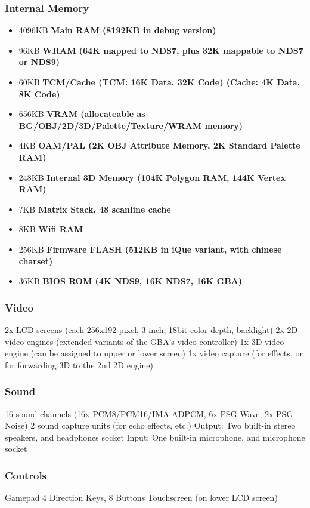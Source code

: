 \documentclass[11pt,a4paper]{proc}
\begin{document}
\begin{flushleft}
\subsubsection{Internal Memory}
\begin{itemize}
\item 4096KB \textbf{Main RAM (8192KB in debug version)}
\item 96KB   \textbf{WRAM (64K mapped to NDS7, plus 32K mappable to NDS7 or NDS9)}
\item 60KB   \textbf{TCM/Cache (TCM: 16K Data, 32K Code) (Cache: 4K Data, 8K Code)}
\item 656KB  \textbf{VRAM (allocateable as BG/OBJ/2D/3D/Palette/Texture/WRAM memory)}
\item 4KB    \textbf{OAM/PAL (2K OBJ Attribute Memory, 2K Standard Palette RAM)}
\item 248KB  \textbf{Internal 3D Memory (104K Polygon RAM, 144K Vertex RAM)}
\item ?KB    \textbf{Matrix Stack, 48 scanline cache}
\item 8KB    \textbf{Wifi RAM}
\item 256KB  \textbf{Firmware FLASH (512KB in iQue variant, with chinese charset)}
\item 36KB   \textbf{BIOS ROM (4K NDS9, 16K NDS7, 16K GBA)}
\end{itemize}

\subsubsection{Video}
2x LCD screens (each 256x192 pixel, 3 inch, 18bit color depth, backlight)
2x 2D video engines (extended variants of the GBA's video controller)
1x 3D video engine (can be assigned to upper or lower screen)
1x video capture (for effects, or for forwarding 3D to the 2nd 2D engine)

\subsubsection{Sound}
16 sound channels (16x PCM8/PCM16/IMA-ADPCM, 6x PSG-Wave, 2x PSG-Noise)
2 sound capture units (for echo effects, etc.)
Output: Two built-in stereo speakers, and headphones socket
Input:  One built-in microphone, and microphone socket

\subsubsection{Controls}
Gamepad      4 Direction Keys, 8 Buttons
Touchscreen  (on lower LCD screen)


\end{flushleft}
\end{document}

